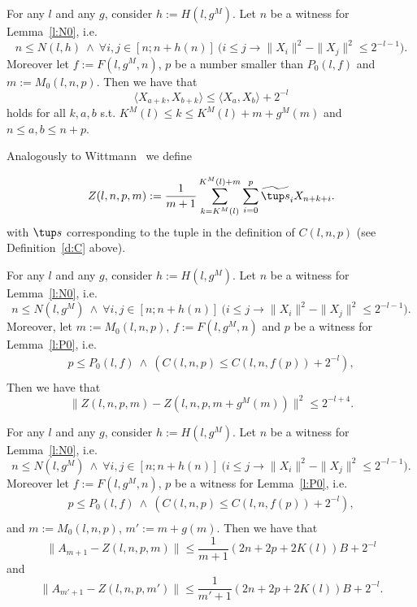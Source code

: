 \begin{lemma}\label{l:scpb}
For any $l$ and any $g$, consider $h:= H(l,g^M)$. Let
$n$ be a witness for Lemma~\ref{l:N0}, i.e. 
\[
n\leq N(l,h)\ \wedge\ \forall i,j\in[n;n+h(n)]\ 
\big( i\leq j\rightarrow \|X_i\|^2-\|X_j\|^2\leq 2^{-l-1} \big) . \tag{N}
\]
Moreover let $f:=F(l,g^M,n)$,
$p$ be a number smaller than $P_0(l,f)$ 
and  $m:=M_0(l,n,p)$. Then we have that
\[ 
\langle X_{a+k},X_{b+k} \rangle \leq \langle X_{a},X_{b} \rangle + 2^{-l}
\]
holds for all $k,a,b$ s.t. $K^M(l)\leq k \leq K^M(l)+m+g^M(m)$ and\\ $ n\leq a,b \leq n+p$.
\end{lemma}

Analogously to Wittmann~\cite{Wittmann90} we define
\begin{dfn}[$Z$]\label{d:Z}
\[Z(l,n,p,m):=\frac{1}{m+1}\sum^{K^M(l)+m}_{k=K^M(l)}\sum^{p}_{i=0}  \widetilde{\tup s}_i X_{n+k+i}. \]
with $\tup s$ corresponding to the tuple in the definition of $C(l,n,p)$ (see
Definition~\ref{d:C} above). 
\end{dfn}

\begin{lemma}\label{l:Zs}
For any $l$ and any $g$, consider $h:= H(l,g^M)$. Let
$n$ be a witness for Lemma~\ref{l:N0}, i.e. 
\[
n\leq N(l,g^M)\ \wedge\ \forall i,j\in[n;n+h(n)]\ 
\big( i\leq j\rightarrow \|X_i\|^2-\|X_j\|^2\leq 2^{-l-1} \big) . \tag{N} 
\]
Moreover, let $m:=M_0(l,n,p)$, $f:=F(l,g^M,n)$ and 
$p$ be a witness for Lemma~\ref{l:P0}, i.e. 
\begin{align*}
p\leq P_0(l,f)\ \wedge\ ( C(l,n,p)\leq C(l,n,f(p)) + 2^{-l}  ),  \tag{P}\\
\end{align*} 
Then we have that
\[ 
\|Z(l,n,p,m) - Z( l,n,p,m+g^M(m) ) \|^2 \leq 2^{-l+4}.
\]
\end{lemma}

\begin{lemma}\label{l:ZA}
For any $l$ and any $g$, consider $h:= H(l,g^M)$. Let
$n$ be a witness for Lemma~\ref{l:N0}, i.e. 
\[
n\leq N(l,g^M)\ \wedge\ \forall i,j\in[n;n+h(n)]\ 
\big( i\leq j\rightarrow \|X_i\|^2-\|X_j\|^2\leq 2^{-l-1} \big) . \tag{N} 
\]
Moreover let $f:=F(l,g^M,n)$,
$p$ be a witness for Lemma~\ref{l:P0}, i.e. 
\begin{align*}
p\leq P_0(l,f)\ \wedge\ ( C(l,n,p)\leq C(l,n,f(p)) + 2^{-l}  ),  \tag{P}\\
\end{align*} 
and  $m:=M_0(l,n,p)$, $m':=m+g(m)$.
Then we have that
\[
 \|A_{m+1} - Z( l,n,p,m )\|\leq \frac{1}{m+1}(2n + 2p + 2K(l))B +2^{-l}
\]
and
\[
 \|A_{m'+1} - Z( l,n,p,m' )\|\leq \frac{1}{m'+1}(2n + 2p + 2K(l))B +2^{-l}.
\]
\end{lemma}



